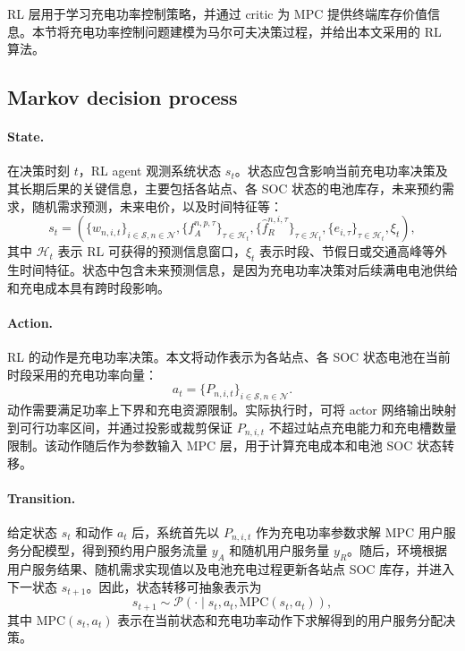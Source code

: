 \documentclass[12pt,hyperref,a4paper,UTF8]{ctexart}
\begin{document}
RL 层用于学习充电功率控制策略，并通过 critic 为 MPC 提供终端库存价值信息。本节将充电功率控制问题建模为马尔可夫决策过程，并给出本文采用的 RL 算法。

\subsection{Markov decision process}

\paragraph{State.}
在决策时刻 $t$，RL agent 观测系统状态 $s_t$。状态应包含影响当前充电功率决策及其长期后果的关键信息，主要包括各站点、各 SOC 状态的电池库存，未来预约需求，随机需求预测，未来电价，以及时间特征等：
\begin{equation}
s_t=
\left(
\{w_{n,i,t}\}_{i\in\mathcal{S},n\in\mathcal{N}},
\{f_A^{n,p,\tau}\}_{\tau\in\mathcal{H}_t},
\{\hat f_R^{n,i,\tau}\}_{\tau\in\mathcal{H}_t},
\{e_{i,\tau}\}_{\tau\in\mathcal{H}_t},
\xi_t
\right),
\label{eq:rl_state}
\end{equation}
其中 $\mathcal{H}_t$ 表示 RL 可获得的预测信息窗口，$\xi_t$ 表示时段、节假日或交通高峰等外生时间特征。状态中包含未来预测信息，是因为充电功率决策对后续满电电池供给和充电成本具有跨时段影响。

\paragraph{Action.}
RL 的动作是充电功率决策。本文将动作表示为各站点、各 SOC 状态电池在当前时段采用的充电功率向量：
\begin{equation}
a_t=
\{P_{n,i,t}\}_{i\in\mathcal{S},n\in\mathcal{N}}.
\label{eq:rl_action}
\end{equation}
动作需要满足功率上下界和充电资源限制。实际执行时，可将 actor 网络输出映射到可行功率区间，并通过投影或裁剪保证 $P_{n,i,t}$ 不超过站点充电能力和充电槽数量限制。该动作随后作为参数输入 MPC 层，用于计算充电成本和电池 SOC 状态转移。

\paragraph{Transition.}
给定状态 $s_t$ 和动作 $a_t$ 后，系统首先以 $P_{n,i,t}$ 作为充电功率参数求解 MPC 用户服务分配模型，得到预约用户服务流量 $y_A$ 和随机用户服务量 $y_R$。随后，环境根据用户服务结果、随机需求实现值以及电池充电过程更新各站点 SOC 库存，并进入下一状态 $s_{t+1}$。因此，状态转移可抽象表示为
\begin{equation}
s_{t+1}\sim \mathcal{P}(\cdot\mid s_t,a_t,\mathrm{MPC}(s_t,a_t)),
\label{eq:rl_transition}
\end{equation}
其中 $\mathrm{MPC}(s_t,a_t)$ 表示在当前状态和充电功率动作下求解得到的用户服务分配决策。
\end{document}
